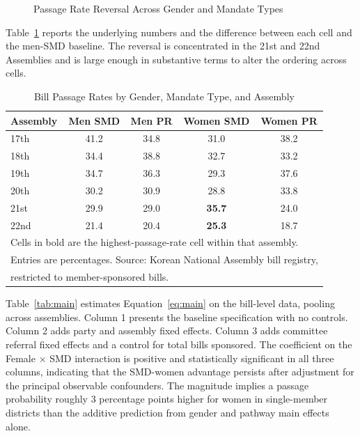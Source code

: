 \documentclass[11pt]{article}
\begin{document}
\begin{figure}[H]
\centering
{}
\caption{Passage Rate Reversal Across Gender and Mandate Types}
\label{fig:passrate}
\end{figure}

Table~\ref{tab:passage} reports the underlying numbers and the difference between each cell and the men-SMD baseline. The reversal is concentrated in the 21st and 22nd Assemblies and is large enough in substantive terms to alter the ordering across cells.

\begin{table}[H]
\centering
\caption{Bill Passage Rates by Gender, Mandate Type, and Assembly}
\label{tab:passage}
\begin{tabular}{lcccc}
\toprule
Assembly & Men SMD & Men PR & Women SMD & Women PR \\
\midrule
17th & 41.2 & 34.8 & 31.0 & 38.2 \\
18th & 34.4 & 38.8 & 32.7 & 33.2 \\
19th & 34.7 & 36.3 & 29.3 & 37.6 \\
20th & 30.2 & 30.9 & 28.8 & 33.8 \\
21st & 29.9 & 29.0 & \textbf{35.7} & 24.0 \\
22nd & 21.4 & 20.4 & \textbf{25.3} & 18.7 \\
\bottomrule
\multicolumn{5}{l}{\footnotesize Cells in bold are the highest-passage-rate cell within that assembly.} \\
\multicolumn{5}{l}{\footnotesize Entries are percentages. Source: Korean National Assembly bill registry,} \\
\multicolumn{5}{l}{\footnotesize restricted to member-sponsored bills.} \\
\end{tabular}
\end{table}

Table~\ref{tab:main} estimates Equation~\ref{eq:main} on the bill-level data, pooling across assemblies. Column 1 presents the baseline specification with no controls. Column 2 adds party and assembly fixed effects. Column 3 adds committee referral fixed effects and a control for total bills sponsored. The coefficient on the Female $\times$ SMD interaction is positive and statistically significant in all three columns, indicating that the SMD-women advantage persists after adjustment for the principal observable confounders. The magnitude implies a passage probability roughly 3 percentage points higher for women in single-member districts than the additive prediction from gender and pathway main effects alone.
\end{document}
